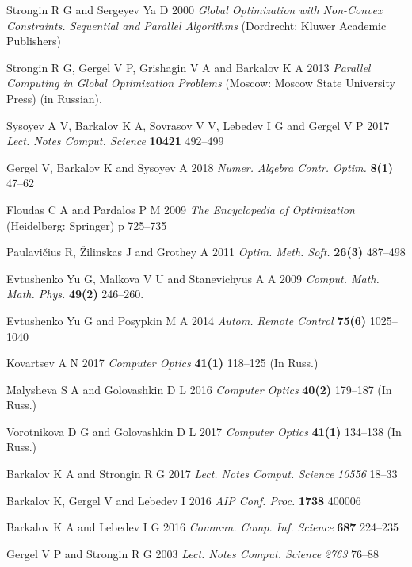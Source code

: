\documentclass[a4paper]{jpconf}
\begin{document}
\begin{thebibliography}{9}

Strongin R G and Sergeyev Ya D 2000 \textit{Global Optimization with Non-Convex Constraints. Sequential 
and Parallel Algorithms} (Dordrecht: Kluwer Academic Publishers)

Strongin R G, Gergel V P, Grishagin V A and Barkalov K A 2013  \textit{Parallel Computing in Global Optimization Problems} (Moscow: Moscow State University Press) (in Russian).

Sysoyev A V, Barkalov K A, Sovrasov V V, Lebedev I G and Gergel V P 2017 \textit{Lect. Notes Comput. Science} \textbf{10421} 492--499

Gergel  V, Barkalov K and Sysoyev A 2018 \textit{Numer. Algebra Contr. Optim.} \textbf{8(1)} 47--62

Floudas C A and Pardalos P M 2009 \textit{The Encyclopedia of Optimization } (Heidelberg: Springer) p 725--735 

Paulavi\v{c}ius R, \v{Z}ilinskas J and Grothey A 2011 \textit{Optim. Meth. Soft.} \textbf{26(3)} 487--498

Evtushenko Yu G, Malkova V U and Stanevichyus A A 2009 \textit{Comput. Math. Math. Phys.} \textbf{49(2)} 246--260.

Evtushenko Yu G and Posypkin M A 2014 \textit{Autom. Remote Control} \textbf{75(6)} 1025--1040

Kovartsev A N 2017 \textit{Computer Optics} \textbf{41(1)} 118--125 (In Russ.)

Malysheva S A and Golovashkin D L 2016 \textit{Computer Optics} \textbf{40(2)} 179--187 (In Russ.)

Vorotnikova D G and Golovashkin D L 2017 \textit{Computer Optics} \textbf{41(1)} 134--138 (In Russ.)

Barkalov K A and Strongin R G 2017 \textit{Lect. Notes Comput. Science} \textit{10556} 18--33

Barkalov K, Gergel V and Lebedev I  2016 \textit{AIP Conf. Proc.} \textbf{1738} 400006

Barkalov K A and Lebedev I G 2016 \textit{Commun. Comp. Inf. Science} \textbf{687} 224--235

Gergel V P and Strongin R G 2003 \textit{Lect. Notes Comput. Science} \textit{2763} 76--88


\end{thebibliography}
\end{document}
